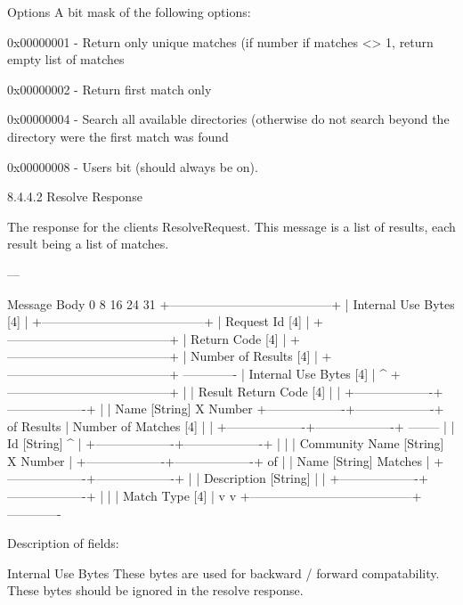 \documentclass[titlepage,oneside]{book}
\begin{document}
Options
  A bit mask of the following options:

    0x00000001 - Return only unique matches (if number if matches <> 1,
    return empty list of matches

    0x00000002 - Return first match only

    0x00000004 - Search all available directories (otherwise do not
    search beyond the directory were the first match was found

    0x00000008 - Users bit (should always be on).

8.4.4.2 Resolve Response

The response for the clients ResolveRequest. This message is a list of
results, each result being a list of matches.

---


Message Body
0         8         16        24      31
+---------------------------------------+
|       Internal Use Bytes [4]          |
+---------------------------------------+
|            Request Id [4]             |
+---------------------------------------+
|            Return Code [4]            |
+---------------------------------------+
|        Number of Results [4]          |
+---------------------------------------+   -------------
|       Internal Use Bytes [4]          |              ^
+---------------------------------------+              |
|        Result Return Code [4]         |              |
+-------------------+-------------------+              |
| Name [String]                                     X Number
+-------------------+-------------------+          of Results
|       Number of Matches [4]           |              |
+-------------------+-------------------+   --------   |
| Id [String]                                 ^        |
+-------------------+-------------------+     |        |
| Community Name [String]                   X Number   |
+-------------------+-------------------+     of       |
| Name [String]                             Matches    |
+-------------------+-------------------+              |
| Description [String]                        |        |
+-------------------+-------------------+     |        |
|          Match Type [4]               |     v        v
+---------------------------------------+   -------------


Description of fields:

Internal Use Bytes
  These bytes are used for backward / forward compatability. These
  bytes should be ignored in the resolve response.
\end{document}
